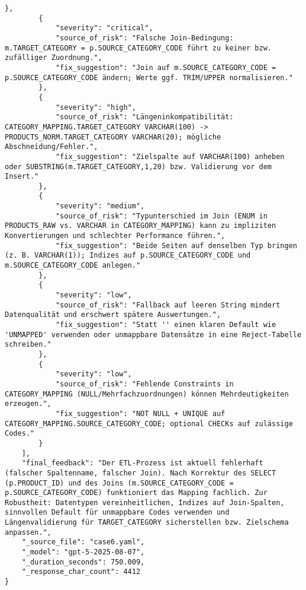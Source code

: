 \begin{lstlisting}[caption={Ausgabe: GPT-5 Anwendungsfall 6 Hauptdurchlauf},label={gpt_case6_prompt1}]
        },
        {
            "severity": "critical",
            "source_of_risk": "Falsche Join-Bedingung: m.TARGET_CATEGORY = p.SOURCE_CATEGORY_CODE führt zu keiner bzw. zufälliger Zuordnung.",
            "fix_suggestion": "Join auf m.SOURCE_CATEGORY_CODE = p.SOURCE_CATEGORY_CODE ändern; Werte ggf. TRIM/UPPER normalisieren."
        },
        {
            "severity": "high",
            "source_of_risk": "Längeninkompatibilität: CATEGORY_MAPPING.TARGET_CATEGORY VARCHAR(100) -> PRODUCTS_NORM.TARGET_CATEGORY VARCHAR(20); mögliche Abschneidung/Fehler.",
            "fix_suggestion": "Zielspalte auf VARCHAR(100) anheben oder SUBSTRING(m.TARGET_CATEGORY,1,20) bzw. Validierung vor dem Insert."
        },
        {
            "severity": "medium",
            "source_of_risk": "Typunterschied im Join (ENUM in PRODUCTS_RAW vs. VARCHAR in CATEGORY_MAPPING) kann zu impliziten Konvertierungen und schlechter Performance führen.",
            "fix_suggestion": "Beide Seiten auf denselben Typ bringen (z. B. VARCHAR(1)); Indizes auf p.SOURCE_CATEGORY_CODE und m.SOURCE_CATEGORY_CODE anlegen."
        },
        {
            "severity": "low",
            "source_of_risk": "Fallback auf leeren String mindert Datenqualität und erschwert spätere Auswertungen.",
            "fix_suggestion": "Statt '' einen klaren Default wie 'UNMAPPED' verwenden oder unmappbare Datensätze in eine Reject-Tabelle schreiben."
        },
        {
            "severity": "low",
            "source_of_risk": "Fehlende Constraints in CATEGORY_MAPPING (NULL/Mehrfachzuordnungen) können Mehrdeutigkeiten erzeugen.",
            "fix_suggestion": "NOT NULL + UNIQUE auf CATEGORY_MAPPING.SOURCE_CATEGORY_CODE; optional CHECKs auf zulässige Codes."
        }
    ],
    "final_feedback": "Der ETL-Prozess ist aktuell fehlerhaft (falscher Spaltenname, falscher Join). Nach Korrektur des SELECT (p.PRODUCT_ID) und des Joins (m.SOURCE_CATEGORY_CODE = p.SOURCE_CATEGORY_CODE) funktioniert das Mapping fachlich. Zur Robustheit: Datentypen vereinheitlichen, Indizes auf Join-Spalten, sinnvollen Default für unmappbare Codes verwenden und Längenvalidierung für TARGET_CATEGORY sicherstellen bzw. Zielschema anpassen.",
    "_source_file": "case6.yaml",
    "_model": "gpt-5-2025-08-07",
    "_duration_seconds": 750.009,
    "_response_char_count": 4412
}
\end{lstlisting}

